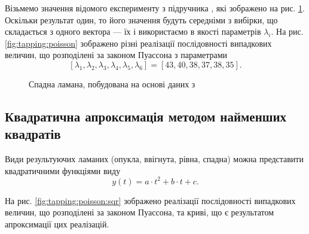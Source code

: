 Візьмемо значення відомого експерименту з підручника \cite{Ilin:2001}, які
зображено на рис. \ref{fig:tapping:Ilin01}.
Оскільки результат один, то його значення будуть середніми з вибірки, що
складається з одного вектора --- їх і використаємо в якості параметрів
$\lambda_i$.
На рис. \ref{fig:tapping:poisson} зображено різні реалізації послідовності
випадкових величин, що розподілені за законом Пуассона з параметрами
\begin{equation}\label{eq:tapping:poisson}
  \left[ \lambda_{1}, \lambda_{2}, \lambda_{3}, \lambda_{4}, \lambda_{5},
         \lambda_{6} \right]
  = \left[ 43, 40, 38, 37, 38, 35 \right].
\end{equation}

\begin{figure}[h]
  \centering
  \caption{Спадна ламана, побудована на основі даних з \cite{Ilin:2001}}
  \label{fig:tapping:Ilin01}
\end{figure}


\subsection{Квадратична апроксимація методом найменших квадратів}

Види результуючих ламаних (опукла, ввігнута, рівна, спадна) можна представити
квадратичними функціями виду
\begin{equation*}
  y\left( t \right) = a \cdot t^2 + b \cdot t + c.
\end{equation*}

На рис. \ref{fig:tapping:poisson:sqr} зображено реалізації послідовності
випадкових величин, що розподілені за законом Пуассона, та криві, що є
результатом апроксимації цих реалізацій.


